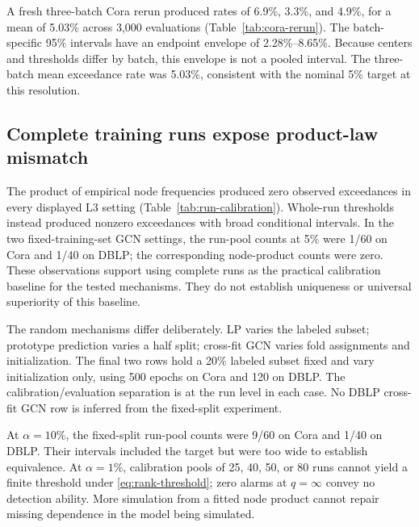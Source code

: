 A fresh three-batch Cora rerun produced rates of 6.9\%, 3.3\%, and
4.9\%, for a mean of 5.03\% across 3,000 evaluations
(Table~\ref{tab:cora-rerun}). The batch-specific 95\% intervals have
an endpoint envelope of 2.28\%--8.65\%. Because centers and thresholds
differ by batch, this envelope is not a pooled interval. The three-batch
mean exceedance rate was 5.03\%, consistent with the nominal 5\% target
at this resolution.



\subsection{Complete training runs expose product-law mismatch}
The product of empirical node frequencies produced zero observed
exceedances in every displayed L3 setting (Table~\ref{tab:run-calibration}).
Whole-run thresholds instead produced nonzero exceedances with broad
conditional intervals. In the two fixed-training-set GCN settings,
the run-pool counts at 5\% were 1/60 on Cora and 1/40 on DBLP;
the corresponding node-product counts were zero. These observations
support using complete runs as the practical calibration baseline for
the tested mechanisms. They do not establish uniqueness or universal
superiority of this baseline.



The random mechanisms differ deliberately. LP varies the labeled
subset; prototype prediction varies a half split; cross-fit GCN varies
fold assignments and initialization. The final two rows hold a 20\%
labeled subset fixed and vary initialization only, using 500 epochs on
Cora and 120 on DBLP. The calibration/evaluation separation is at the
run level in each case. No DBLP cross-fit GCN row is inferred from the
fixed-split experiment.

At $\alpha=10\%$, the fixed-split run-pool counts were 9/60 on Cora
and 1/40 on DBLP. Their intervals included the target but were too
wide to establish equivalence. At $\alpha=1\%$, calibration pools of
25, 40, 50, or 80 runs cannot yield a finite threshold under
\eqref{eq:rank-threshold}; zero alarms at $q=\infty$ convey no
detection ability. More simulation from a fitted node product cannot
repair missing dependence in the model being simulated.


